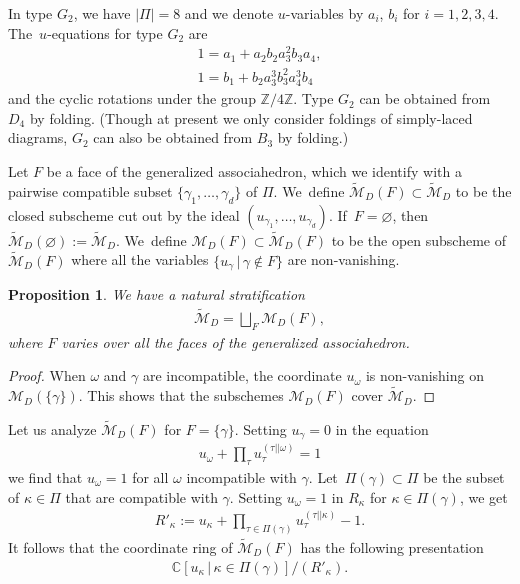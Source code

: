 \documentclass[10pt,a4paper]{amsart}
\def\C{{\mathbb C}}
\def\Z{{\mathbb Z}}
\def\M{{\mathcal{M}}}
\def\tM{{\widetilde {\mathcal{M}}}}
\numberwithin{equation}{section}
\newtheorem{Proposition}[Theorem]{Proposition}
\begin{document}
\medskip{} %
In type $G_2$, we have $|\Pi|=8$ and we denote $u$-variables by $a_i$, $b_i$ for $i =1,2,3,4$. The~$u$-equations for type $G_2$ are
\begin{gather*}
1 = a_1 + a_2 b_2 a^2_3 b_3 a_4, \\
1 = b_1 + b_2 a_3^3 b_3^2 a^3_4 b_4
\end{gather*}
and the cyclic rotations under the group $\Z/4\Z$. Type $G_2$ can be obtained from $D_4$ by folding. (Though at present we only consider foldings of simply-laced diagrams, $G_2$ can also be obtained from $B_3$ by folding.)

\bigskip{}
Let $F$ be a face of the generalized associahedron, which we identify with a pairwise compatible subset $\{\gamma_1,\dots,\gamma_d\}$ of $\Pi$. We~define $\tM_D(F) \subset \tM_D$ to be the closed subscheme cut out by the ideal $(u_{\gamma_1},\dots,u_{\gamma_d})$. If~$F = \varnothing$, then $\tM_D(\varnothing) := \tM_D$. We~define $\M_D(F) \subset \tM_D(F)$ to be the open subscheme of $\tM_D(F)$ where all the variables $\{u_\gamma \,|\, \gamma \notin F\}$ are non-vanishing.

\begin{Proposition}\label{prop:MDstrat}
We have a natural stratification
\begin{gather}\label{eq:Mstrata}
\tM_D = \bigsqcup_{F} \M_D(F),
\end{gather}
where $F$ varies over all the faces of the generalized associahedron.
\end{Proposition}

\begin{proof}
When $\omega$ and $\gamma$ are incompatible, the coordinate $u_\omega$ is non-vanishing on $\M_D(\{\gamma\})$. This shows that the subschemes $\M_D(F)$ cover $\tM_D$.
\end{proof}

\medskip{}
Let us analyze $\tM_D(F)$ for $F = \{\gamma\}$. Setting $u_\gamma = 0$ in the equation
\begin{gather*}
u_\omega + \prod_{\tau} u_{\tau}^{(\tau||\omega)} = 1
\end{gather*}
we find that $u_\omega = 1$ for all $\omega$ incompatible with $\gamma$. Let~$\Pi(\gamma) \subset \Pi$ be the subset of $\kappa \in \Pi$ that are compatible with $\gamma$.
Setting $u_\omega=1$ in $R_\kappa$ for $\kappa \in \Pi(\gamma)$, we get
\begin{gather*}
R'_\kappa := u_\kappa + \prod_{\tau\in \Pi(\gamma)} u_{\tau}^{(\tau||\kappa)} - 1.
\end{gather*}
It follows that the coordinate ring of $\tM_D(F)$ has the following presentation
\begin{gather*}
\C[u_\kappa \,|\, \kappa\in \Pi(\gamma)]/(R'_\kappa).
\end{gather*}
\end{document}
